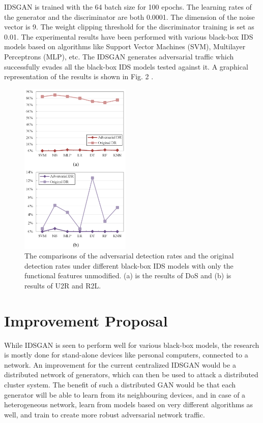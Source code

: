 \documentclass[10pt, conference, compsocconf]{IEEEtran}
\begin{document}
IDSGAN is trained with the 64 batch size for 100 epochs. The learning rates of the generator and the discriminator are both 0.0001. The dimension of the noise vector is 9. The weight clipping threshold for the discriminator training is set as 0.01. The experimental results have been performed with various black-box IDS models based on algorithms like Support Vector Machines (SVM), Multilayer Perceptrons (MLP), etc. The IDSGAN generates adversarial traffic which successfully evades all the black-box IDS models tested against it. A graphical representation of the results is shown in Fig. 2 \cite{lin2018idsgan}.

\begin{center}

\begin{figure}
\includegraphics[width=0.47\textwidth]{./images/img2.png}
\caption{The comparisons of the adversarial detection rates and the original detection rates under different black-box IDS models with only the functional features unmodified. (a) is the results of DoS and (b) is results of U2R and R2L.}
\end{figure}

\end{center}

\section {Improvement Proposal}

While IDSGAN is seen to perform well for various black-box models, the research is mostly done for stand-alone devices like personal computers, connected to a network. An improvement for the current centralized IDSGAN would be a distributed network of generators, which can then be used to attack a distributed cluster system. The benefit of such a distributed GAN would be that each generator will be able to learn from its neighbouring devices, and in case of a heterogeneous network, learn from models based on very different algorithms as well, and train to create more robust adversarial network traffic.
\end{document}
